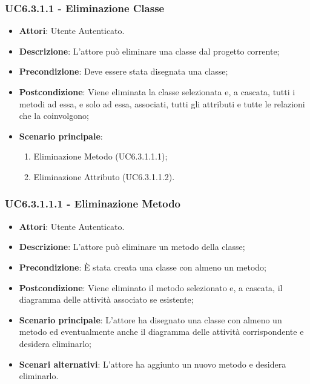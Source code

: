 \subsubsection{UC6.3.1.1 - Eliminazione Classe} 
\label{sssec:UC6.3.1.1} 
\begin{itemize} 
\item \textbf{Attori}: Utente Autenticato.
\item \textbf{Descrizione}: L'attore può eliminare una classe dal progetto corrente;
\item \textbf{Precondizione}: Deve essere stata disegnata una classe;
\item \textbf{Postcondizione}: Viene eliminata la classe selezionata e, a cascata, tutti i metodi ad essa, e solo ad essa, associati, tutti gli attributi e tutte le relazioni che la coinvolgono;
\item \textbf{Scenario principale}: \begin{enumerate}\item Eliminazione Metodo (UC6.3.1.1.1);\item Eliminazione Attributo (UC6.3.1.1.2). 
 \end{enumerate}
\end{itemize} 
\subsubsection{UC6.3.1.1.1 - Eliminazione Metodo} 
\label{sssec:UC6.3.1.1.1} 
\begin{itemize} 
\item \textbf{Attori}: Utente Autenticato.
\item \textbf{Descrizione}: L'attore può eliminare un metodo della classe;
\item \textbf{Precondizione}: È stata creata una classe con almeno un metodo;
\item \textbf{Postcondizione}: Viene eliminato il metodo selezionato e, a cascata, il diagramma delle attività associato se esistente;
\item \textbf{Scenario principale}: L'attore ha disegnato una classe con almeno un metodo ed  eventualmente anche il diagramma delle attività corrispondente e desidera eliminarlo;\item \textbf{Scenari alternativi}: L'attore ha aggiunto un nuovo metodo e desidera eliminarlo.
\end{itemize} 
